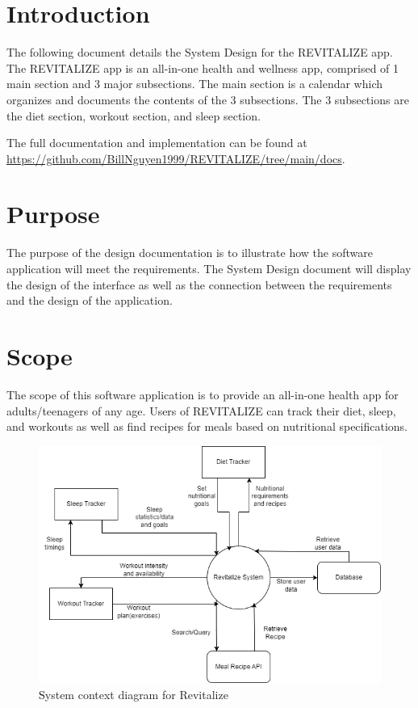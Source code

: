 \documentclass[12pt, titlepage]{article}
\begin{document}
	\newpage
	
	\tableofcontents
	
	\newpage
	
	\listoftables
	
	\listoffigures
	
	\newpage
	
	
	\section{Introduction}
The following document details the System Design for
the REVITALIZE app. The REVITALIZE app is an all-in-one health and wellness app, comprised of 1 main 
section and 3 major subsections. The main section is a calendar which organizes and documents the contents of the 3 subsections. 
The 3 subsections are the diet section, workout section, and sleep section.

The full documentation and implementation can be
found at \url{https://github.com/BillNguyen1999/REVITALIZE/tree/main/docs}.

	
	\section{Purpose}
	
    The purpose of the design documentation is to illustrate how the software application will meet the requirements. The System Design document will display the design of the interface as well as the connection between the requirements and the design of the application. 

	
	\section{Scope}
	
    The scope of this software application is to provide an all-in-one health app for adults/teenagers of any age. Users of REVITALIZE can track their diet, sleep, and workouts as well as find recipes for meals based on nutritional specifications. 
\begin{figure}[H]
	\centering
	\includegraphics[scale=0.5]{system_diagrams/SystemContextDiagram.png}
	\caption{\textcolor{black} System context diagram for Revitalize}
\end{figure}
\end{document}
